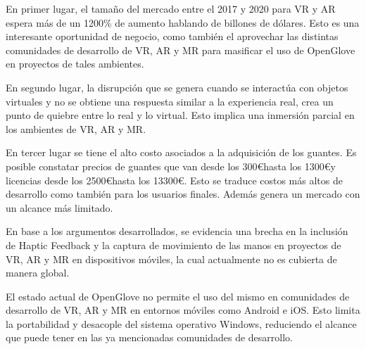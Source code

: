 
En primer lugar, el tamaño del mercado entre el 2017 y 2020 para VR y AR espera más de un 1200\% de aumento hablando de billones de dólares. Esto es una interesante oportunidad de negocio, como también el aprovechar las distintas comunidades de desarrollo de VR, AR y MR para masificar el uso de OpenGlove en proyectos de tales ambientes. 

En segundo lugar, la disrupción que se genera cuando se interactúa con objetos virtuales y no se obtiene una respuesta similar a la experiencia real, crea un punto de quiebre entre lo real y lo virtual. Esto implica una inmersión parcial en los ambientes de VR, AR y MR.

En tercer lugar se tiene el alto costo asociados a la adquisición de los guantes. Es posible constatar precios de guantes que van desde los 300\euro \space hasta los 1300\euro \space y licencias desde los 2500\euro \space hasta los 13300\euro . Esto se traduce  costos más altos de desarrollo como también para los usuarios finales. Además genera un mercado con un alcance más limitado.

En base a los argumentos desarrollados, se evidencia una brecha en la inclusión de Haptic Feedback  y la captura de movimiento de las manos en proyectos de VR, AR y MR en dispositivos móviles, la cual actualmente no es cubierta de manera global.

El estado actual de OpenGlove no permite el uso del mismo en comunidades de desarrollo de VR, AR y MR en entornos móviles como Android e iOS. Esto limita la portabilidad y desacople del sistema operativo Windows, reduciendo el alcance que puede tener en las ya mencionadas comunidades de desarrollo.

